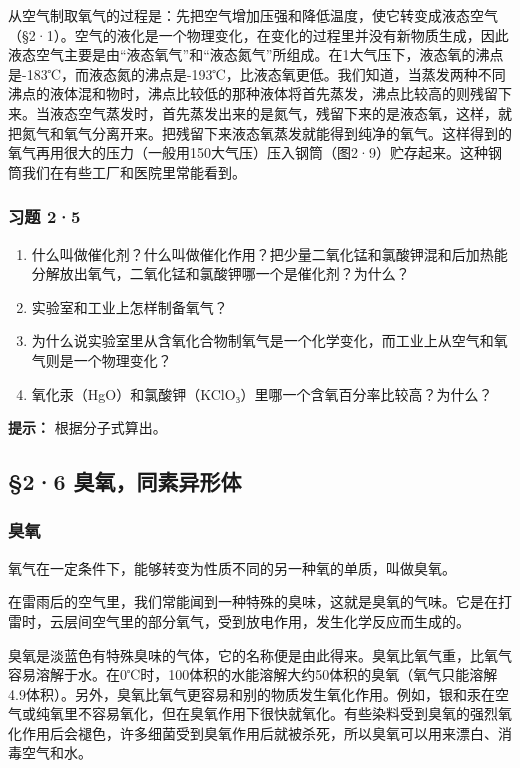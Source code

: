 从空气制取氧气的过程是：先把空气增加压强和降低温度，使它转变成液态空气（§2·1）。空气的液化是一个物理变化，在变化的过程里并没有新物质生成，因此液态空气主要是由``液态氧气''和``液态氮气''所组成。在1大气压下，液态氧的沸点是-183℃，而液态氮的沸点是-193℃，比液态氧更低。我们知道，当蒸发两种不同沸点的液体混和物时，沸点比较低的那种液体将首先蒸发，沸点比较高的则残留下来。当液态空气蒸发时，首先蒸发出来的是氮气，残留下来的是液态氧，这样，就把氮气和氧气分离开来。把残留下来液态氧蒸发就能得到纯净的氧气。这样得到的氧气再用很大的压力（一般用150大气压）压入钢筒（图2·9）贮存起来。这种钢筒我们在有些工厂和医院里常能看到。

\subsubsection{习题 2·5}

\begin{enumerate}
\item
  什么叫做催化剂？什么叫做催化作用？把少量二氧化锰和氯酸钾混和后加热能分解放出氧气，二氧化锰和氯酸钾哪一个是催化剂？为什么？
\item
  实验室和工业上怎样制备氧气？
\item
  为什么说实验室里从含氧化合物制氧气是一个化学变化，而工业上从空气和氧气则是一个物理变化？
\item
  氧化汞（HgO）和氯酸钾（KClO₃）里哪一个含氧百分率比较高？为什么？
\end{enumerate}

\begin{shulihuadef}
\textbf{提示：} 根据分子式算出。
\end{shulihuadef}

\subsection{§2·6 臭氧，同素异形体}

\subsubsection{臭氧}

氧气在一定条件下，能够转变为性质不同的另一种氧的单质，叫做臭氧。

在雷雨后的空气里，我们常能闻到一种特殊的臭味，这就是臭氧的气味。它是在打雷时，云层间空气里的部分氧气，受到放电作用，发生化学反应而生成的。

臭氧是淡蓝色有特殊臭味的气体，它的名称便是由此得来。臭氧比氧气重，比氧气容易溶解于水。在0℃时，100体积的水能溶解大约50体积的臭氧（氧气只能溶解4.9体积）。另外，臭氧比氧气更容易和别的物质发生氧化作用。例如，银和汞在空气或纯氧里不容易氧化，但在臭氧作用下很快就氧化。有些染料受到臭氧的强烈氧化作用后会褪色，许多细菌受到臭氧作用后就被杀死，所以臭氧可以用来漂白、消毒空气和水。

